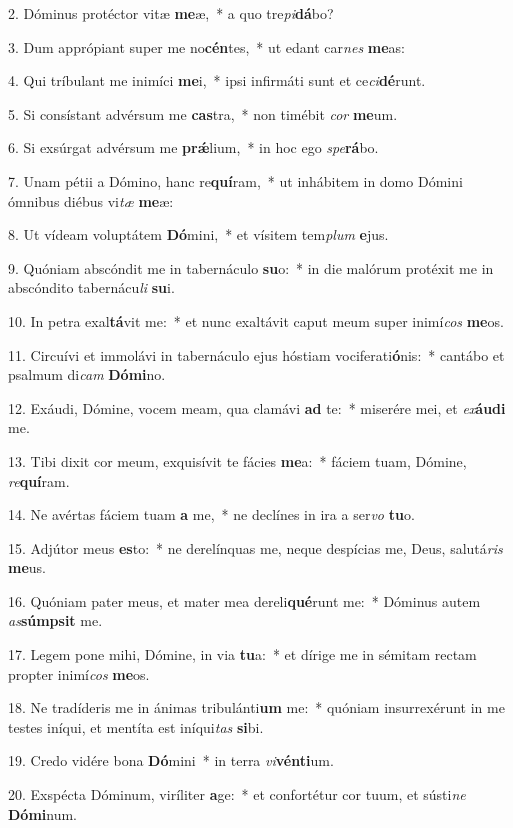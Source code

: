 2. Dóminus protéctor vitæ \textbf{me}æ,~*  a quo tre\textit{pi}\textbf{dá}bo?\

3. Dum apprópiant super me no\textbf{cén}tes,~*  ut edant car\textit{nes} \textbf{me}as:\

4. Qui tríbulant me inimíci \textbf{me}i,~*  ipsi infirmáti sunt et ce\textit{ci}\textbf{dé}runt.\

5. Si consístant advérsum me \textbf{cas}tra,~*  non timébit \textit{cor} \textbf{me}um.\

6. Si exsúrgat advérsum me \textbf{prǽ}lium,~*  in hoc ego \textit{spe}\textbf{rá}bo.\

7. Unam pétii a Dómino, hanc re\textbf{quí}ram,~*  ut inhábitem in domo Dómini ómnibus diébus vi\textit{tæ} \textbf{me}æ:\

8. Ut vídeam voluptátem \textbf{Dó}mini,~*  et vísitem tem\textit{plum} \textbf{e}jus.\

9. Quóniam abscóndit me in tabernáculo \textbf{su}o:~*  in die malórum protéxit me in abscóndito tabernácu\textit{li} \textbf{su}i.\

10. In petra exal\textbf{tá}vit me:~*  et nunc exaltávit caput meum super inimí\textit{cos} \textbf{me}os.\

11. Circuívi et immolávi in tabernáculo ejus hóstiam vociferati\textbf{ó}nis:~*  cantábo et psalmum di\textit{cam} \textbf{Dó}\textbf{mi}no.\

12. Exáudi, Dómine, vocem meam, qua clamávi \textbf{ad} te:~*  miserére mei, et \textit{ex}\textbf{áu}\textbf{di} me.\

13. Tibi dixit cor meum, exquisívit te fácies \textbf{me}a:~*  fáciem tuam, Dómine, \textit{re}\textbf{quí}ram.\

14. Ne avértas fáciem tuam \textbf{a} me,~*  ne declínes in ira a ser\textit{vo} \textbf{tu}o.\

15. Adjútor meus \textbf{es}to:~*  ne derelínquas me, neque despícias me, Deus, salutá\textit{ris} \textbf{me}us.\

16. Quóniam pater meus, et mater mea dereli\textbf{qué}runt me:~*  Dóminus autem \textit{as}\textbf{súmp}\textbf{sit} me.\

17. Legem pone mihi, Dómine, in via \textbf{tu}a:~*  et dírige me in sémitam rectam propter inimí\textit{cos} \textbf{me}os.\

18. Ne tradíderis me in ánimas tribulánti\textbf{um} me:~*  quóniam insurrexérunt in me testes iníqui, et mentíta est iníqui\textit{tas} \textbf{si}bi.\

19. Credo vidére bona \textbf{Dó}mini~*  in terra \textit{vi}\textbf{vén}\textbf{ti}um.\

20. Exspécta Dóminum, viríliter \textbf{a}ge:~*  et confortétur cor tuum, et sústi\textit{ne} \textbf{Dó}\textbf{mi}num.\

